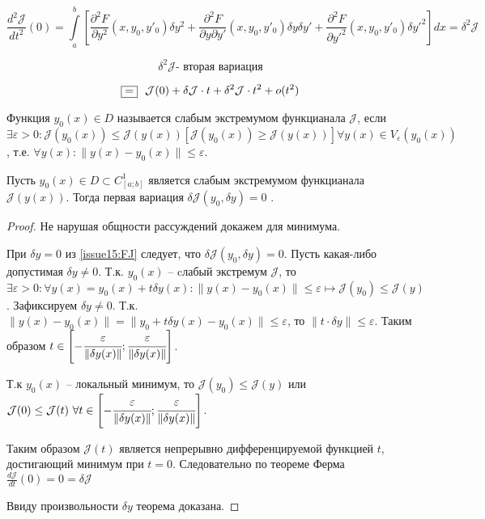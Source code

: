 \begin{equation} \label{issue15:SJ}
    \frac{d^2 \mathcal{J}}{dt^2}(0) = \int \limits_a^b \left[  \frac{\partial^2 F}{\partial y^2}(x, y_0, y'_0) \delta y^2 
    + \frac{\partial^2 F}{\partial y \partial {y'}} (x, y_0, y'_0) \delta y \delta {y'} + \frac{\partial^2 F}{\partial {y'}^2} (x, y_0, y'_0) \delta {y'}^2  \right] dx 
    = \delta^2 \mathcal{J}
\end{equation}

\[ \delta^2 \mathcal{J} \text{- вторая вариация} \]

\[ \fbox{=}~~ \mathcal{J}(0) + \delta \mathcal{J}\cdot t + \delta^2 \mathcal{J} \cdot t^2 + o(t^2)\]

\begin{definition}
    Функция $y_0(x) \in D$ называется слабым экстремумом функцианала $\mathcal{J}$, если $\exists \varepsilon > 0: \mathcal{J}(y_0(x)) \leq \mathcal{J}(y(x)) \left[ \mathcal{J}(y_0(x)) \geq \mathcal{J}(y(x)) \right] \forall y(x) \in V_{\varepsilon} (y_0(x))$, т.е. $\forall y(x): \| y(x) - y_0(x)\| \leq \varepsilon$. 
\end{definition}

\begin{theorem}
    Пусть $y_0(x) \in D \subset C^1_{[a;b]}$ является слабым экстремумом функцианала $\mathcal{J}(y(x))$. Тогда первая вариация $\delta \mathcal{J}(y_0, \delta y) = 0$ .
\end{theorem}
\begin{proof}
    Не нарушая общности рассуждений докажем для минимума.
    
    При $\delta y = 0$ из \eqref{issue15:FJ} следует, что $\delta \mathcal{J}(y_0, \delta y) = 0$. Пусть какая-либо допустимая $\delta y \neq 0$. Т.к. $y_0(x)$ -- cлабый экстремум $\mathcal{J}$, то $\exists \varepsilon > 0: \forall y(x) = y_0(x) + t \delta y(x): \| y(x) - y_0(x) \| \leq \varepsilon \mapsto \mathcal{J}(y_0) \leq \mathcal{J}(y)$. 
    Зафиксируем $\delta y \neq 0$. Т.к. $\| y(x) - y_0(x) \| = \| y_0 + t \delta y(x) - y_0(x)\| \leq \varepsilon$, то $\| t \cdot \delta y \| \leq \varepsilon $. Таким образом $t \in \left[ - \cfrac{\varepsilon}{\| \delta y(x)\|}; \cfrac{\varepsilon}{\| \delta y(x)\|}\right]$. 

    Т.к $y_0(x)$ -- локальный минимум, то $\mathcal{J}(y_0) \leq \mathcal{J}(y)$ или $\mathcal{J}(0) \leq \mathcal{J}(t)~\forall t \in \left[ - \cfrac{\varepsilon}{\| \delta y(x)\|}; \cfrac{\varepsilon}{\| \delta y(x)\|} \right]$. 

    Таким образом $\mathcal{J}(t)$ является непрерывно дифференцируемой функцией $t$, достигающий минимум при $t = 0$. Следовательно по теореме Ферма $\frac{d \mathcal{J}}{dt} (0) = 0 = \delta \mathcal{J}$
    
    Ввиду произвольности $\delta y$ теорема доказана. 
\end{proof}

